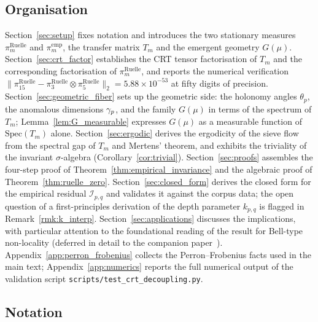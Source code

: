 \subsection{Organisation}
\label{ssec:organisation}

Section~\ref{sec:setup} fixes notation and introduces the two
stationary measures $\pi_m^{\mathrm{Ruelle}}$ and
$\pi_m^{\mathrm{emp}}$, the transfer matrix $T_m$ and the emergent
geometry $G(\mu)$.
Section~\ref{sec:crt_factor} establishes the CRT tensor
factorisation of $T_m$ and the corresponding factorisation of
$\pi_m^{\mathrm{Ruelle}}$, and reports the numerical verification
$\|\pi_{15}^{\mathrm{Ruelle}} - \pi_3^{\mathrm{Ruelle}} \otimes
\pi_5^{\mathrm{Ruelle}}\|_2 = 5.88 \times 10^{-53}$ at fifty digits
of precision.
Section~\ref{sec:geometric_fiber} sets up the geometric side: the
holonomy angles $\theta_p$, the anomalous dimensions $\gamma_{p}$, and
the family $G(\mu)$ in terms of the spectrum of $T_m$;
Lemma~\ref{lem:G_measurable} expresses $G(\mu)$ as a measurable
function of $\mathrm{Spec}(T_m)$ alone.
Section~\ref{sec:ergodic} derives the ergodicity of the sieve flow
from the spectral gap of $T_m$ and Mertens' theorem, and exhibits
the triviality of the invariant $\sigma$-algebra
(Corollary~\ref{cor:trivial}).
Section~\ref{sec:proofs} assembles the four-step proof of
Theorem~\ref{thm:empirical_invariance} and the algebraic proof of
Theorem~\ref{thm:ruelle_zero}.
Section~\ref{sec:closed_form} derives the closed form for the
empirical residual $\mathcal{I}_{p,q}$ and validates it against the
corpus data; the open question of a first-principles derivation of
the depth parameter $k_{p,q}$ is flagged in
Remark~\ref{rmk:k_interp}.
Section~\ref{sec:applications} discusses the implications, with
particular attention to the foundational reading of the result for
Bell-type non-locality (deferred in detail to the companion
paper~\cite{PT_HOLONOMY_NONLOCALITY}).
Appendix~\ref{app:perron_frobenius} collects the Perron--Frobenius
facts used in the main text;
Appendix~\ref{app:numerics} reports the full numerical output of
the validation script \texttt{scripts/test\_crt\_decoupling.py}.

\subsection{Notation}
\label{ssec:notation}

